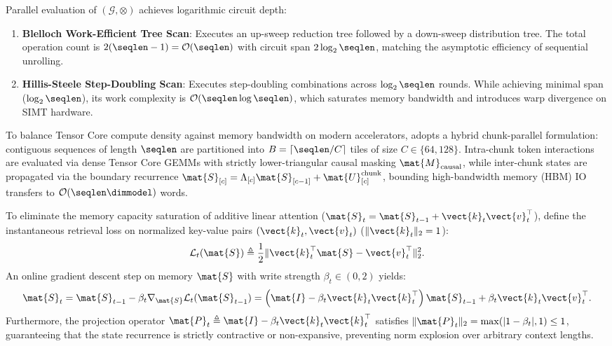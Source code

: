 Parallel evaluation of $(\mathcal{G}, \otimes)$ achieves logarithmic circuit depth:
\begin{enumerate}
    \item \textbf{Blelloch Work-Efficient Tree Scan}: Executes an up-sweep reduction tree followed by a down-sweep distribution tree. The total operation count is $2(\seqlen - 1) = \mathcal{O}(\seqlen)$ with circuit span $2 \log_2 \seqlen$, matching the asymptotic efficiency of sequential unrolling.
    \item \textbf{Hillis-Steele Step-Doubling Scan}: Executes step-doubling combinations across $\log_2 \seqlen$ rounds. While achieving minimal span ($\log_2 \seqlen$), its work complexity is $\mathcal{O}(\seqlen \log \seqlen)$, which saturates memory bandwidth and introduces warp divergence on SIMT hardware.
\end{enumerate}

To balance Tensor Core compute density against memory bandwidth on modern accelerators, \neuralops{} adopts a hybrid chunk-parallel formulation: contiguous sequences of length $\seqlen$ are partitioned into $B = \lceil \seqlen / C \rceil$ tiles of size $C \in \{64, 128\}$. Intra-chunk token interactions are evaluated via dense Tensor Core GEMMs with strictly lower-triangular causal masking $\mat{M}_{\text{causal}}$, while inter-chunk states are propagated via the boundary recurrence $\mat{S}_{[c]} = \Lambda_{[c]} \mat{S}_{[c-1]} + \mat{U}_{[c]}^{\text{chunk}}$, bounding high-bandwidth memory (HBM) IO transfers to $\mathcal{O}(\seqlen \dimmodel)$ words.

\begin{lemma}
\label{lem:delta_rule_derivation}
To eliminate the memory capacity saturation of additive linear attention ($\mat{S}_t = \mat{S}_{t-1} + \vect{k}_t \vect{v}_t^\top$), define the instantaneous retrieval loss on normalized key-value pairs $(\vect{k}_t, \vect{v}_t)$ ($\|\vect{k}_t\|_2 = 1$):
\begin{equation}
\mathcal{L}_t(\mat{S}) \triangleq \frac{1}{2} \|\vect{k}_t^\top \mat{S} - \vect{v}_t^\top\|_2^2.
\label{eq:instantaneous_retrieval_loss}
\end{equation}
An online gradient descent step on memory $\mat{S}$ with write strength $\beta_t \in (0, 2)$ yields:
\begin{equation}
\mat{S}_t = \mat{S}_{t-1} - \beta_t \nabla_{\mat{S}} \mathcal{L}_t(\mat{S}_{t-1}) = \left(\mat{I} - \beta_t \vect{k}_t \vect{k}_t^\top\right) \mat{S}_{t-1} + \beta_t \vect{k}_t \vect{v}_t^\top.
\label{eq:delta_rule_update}
\end{equation}
Furthermore, the projection operator $\mat{P}_t \triangleq \mat{I} - \beta_t \vect{k}_t \vect{k}_t^\top$ satisfies $\|\mat{P}_t\|_2 = \max(|1 - \beta_t|, 1) \le 1$, guaranteeing that the state recurrence is strictly contractive or non-expansive, preventing norm explosion over arbitrary context lengths.
\end{lemma}

